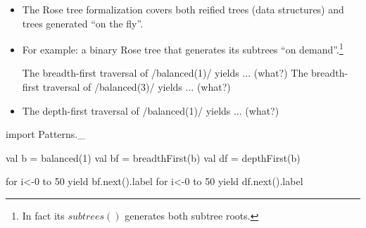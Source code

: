 \documentclass{ip3}
\begin{document}
\begin{foil}
\begin{itemize}
\item The Rose tree formalization covers both reified trees (data structures) and
trees generated ``on the fly''.

\item For example: a binary Rose tree that generates its subtrees ``on demand''.\footnote{In
fact its $subtrees()$ generates both subtree roots.}


\vitem The breadth-first traversal of \sc/balanced(1)/ yields ... (what?)
\vitem The breadth-first traversal of \sc/balanced(3)/ yields ... (what?)
\item The depth-first traversal of \sc/balanced(1)/ yields ... (what?)
\end{itemize}
\begin{code*}[Rose.sc]
import Patterns._

val b  = balanced(1)
val bf = breadthFirst(b)
val df = depthFirst(b)

for { i<-0 to 50 } yield { bf.next().label }
for { i<-0 to 50 } yield { df.next().label }
\end{code*}
\end{foil}
\end{document}
